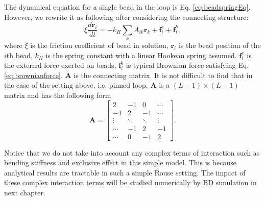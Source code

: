The dynamical equation for a single bead in the loop is Eq. \eqref{eq:beadspringEq}. However, we rewrite it as following after considering the connecting structure:  
\begin{equation}
    \label{eq:beadspringConnect}
    \xi \frac{d \mathbf{r}_i}{dt} = - k_H \sum_{k} A_{ik} \mathbf{r}_k + \mathbf{f}_i^e + \mathbf{f}_i^b,
\end{equation}
where $\xi$ is the friction coefficient of bead in solution, $\mathbf{r}_i$ is the bead position of the $i$th bead, $k_H$ is the spring constant with a linear Hookean spring assumed. $\mathbf{f}_i^e$ is the external force exerted on beads, $\mathbf{f}_i^b$ is typical Brownian force satisfying Eq. \eqref{eq:brownianforce}.
$\mathbf A$ is the connecting matrix. It is not difficult to find that in the case of the setting above, i.e. pinned loop, $\mathbf{A}$ is a $(L-1)\times (L-1)$ matrix and has the following form
\begin{equation}
    \label{eq:connectMatrix}
    \mathbf{A} = \begin{bmatrix}
        2 & -1 & 0   & \cdots   \\
        -1 & 2 & -1  &  \cdots  \\
        \vdots & \ddots &\ddots&\vdots\\
        \cdots & -1 &2 & -1 \\
        \cdots & 0 &-1 &2
    \end{bmatrix}.
\end{equation}

Notice that we do not take into account any complex terms of interaction such as bending stiffness and exclusive effect in this simple model. This is because analytical results are tractable in such a simple Rouse setting. The impact of these complex interaction terms will be studied numerically by BD simulation in next chapter. 

